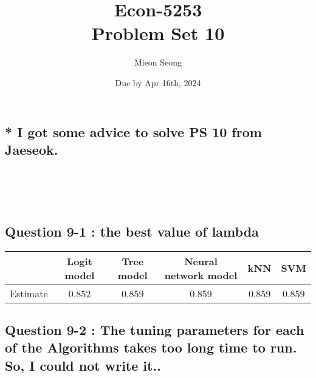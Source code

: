 \documentclass[12pt, letterpaper]{article}
\title{Econ-5253\\
{Problem Set 10}  \\
\large  \vspace{-1em}}
\author{Mieon Seong}
\date{Due by Apr 16th, 2024}
\begin{document}
\setlength{\abovedisplayskip}{5pt}
\setlength{\belowdisplayskip}{5pt}
\setlength{\abovedisplayshortskip}{5pt}
\setlength{\belowdisplayshortskip}{5pt}

\maketitle

\subsection*{* I got some advice to solve PS 10 from Jaeseok.}
\\
\\
\\
\subsection*{Question 9-1 : the best value of lambda}

\begin{table}[h]
\begin{tabular}{|c|c|c|c|c|c|}
\hline
         & Logit model & Tree model & Neural network model & kNN   & SVM   \\ \hline
Estimate & 0.852       & 0.859      & 0.859                & 0.859 & 0.859 \\ \hline
\end{tabular}
\end{table}

\subsection*{Question 9-2 : The tuning parameters for each of the Algorithms takes too long time to run. So, I could not write it.. }
\end{document}
